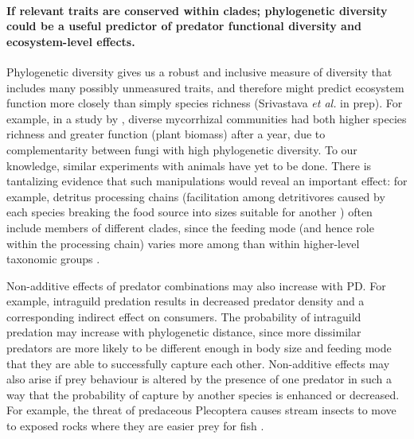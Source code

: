 \documentclass[10pt]{article}
\begin{document}
\begin{spacing}{2}
\paragraph{If relevant traits are conserved within clades;
  phylogenetic diversity could be a useful predictor of predator
  functional diversity and ecosystem-level effects.} Phylogenetic
diversity gives us a robust and inclusive measure of diversity that
includes many possibly unmeasured traits, and therefore might predict
ecosystem function more closely than simply species richness
(Srivastava \emph{et al.}  in prep). For example, in a study by
\citet{Maherali2007}, diverse mycorrhizal communities had both higher
species richness and greater function (plant biomass) after a year,
due to complementarity between fungi with high phylogenetic
diversity. To our knowledge, similar experiments with animals have yet
to be done. There is tantalizing evidence that such manipulations
would reveal an important effect: for example, detritus processing
chains (facilitation among detritivores caused by each species
breaking the food source into sizes suitable for another
\citep{heard1994processing}) often include members of different
clades, since the feeding mode (and hence role within the processing
chain) varies more among than within higher-level taxonomic groups
\citep{Merritt2009}.


Non-additive effects of predator combinations may also increase with
PD. For example, intraguild predation results in decreased predator
density and a corresponding indirect effect on consumers. The
probability of intraguild predation may increase with phylogenetic
distance, since more dissimilar predators are more likely to be
different enough in body size and feeding mode that they are able to
successfully capture each other. Non-additive effects may also arise
if prey behaviour is altered by the presence of one predator in such a
way that the probability of capture by another species is enhanced or
decreased. For example, the threat of predaceous Plecoptera causes
stream insects to move to exposed rocks where they are easier prey for
fish \citep{Soluk1997}.


\end{spacing}
\end{document}
